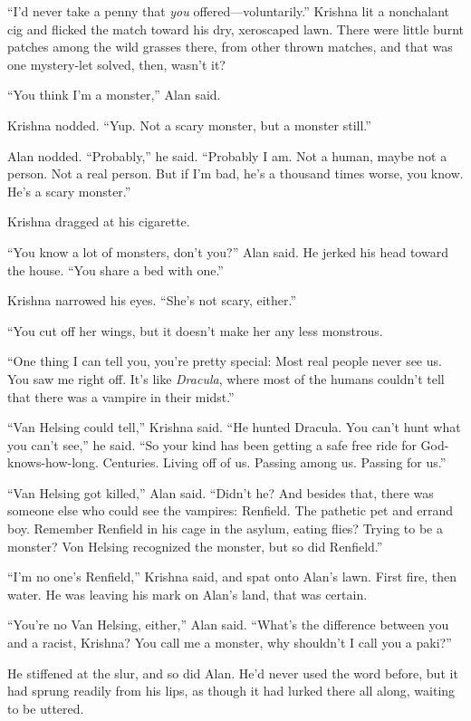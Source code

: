 \documentclass{article}
\begin{document}
``I'd never take a penny that \textit{you} offered---voluntarily.''
Krishna lit a nonchalant cig and flicked the match toward his dry,
xeroscaped lawn.  There were little burnt patches among the wild
grasses there, from other thrown matches, and that was one mystery-let
solved, then, wasn't it?

``You think I'm a monster,'' Alan said.

Krishna nodded.  ``Yup.  Not a scary monster, but a monster still.''

Alan nodded.  ``Probably,'' he said.  ``Probably I am.  Not a human,
maybe not a person.  Not a real person.  But if I'm bad, he's a
thousand times worse, you know.  He's a scary monster.''

Krishna dragged at his cigarette.

``You know a lot of monsters, don't you?'' Alan said.  He jerked his
head toward the house.  ``You share a bed with one.''

Krishna narrowed his eyes.  ``She's not scary, either.''

``You cut off her wings, but it doesn't make her any less monstrous.

``One thing I can tell you, you're pretty special:  Most real people
never see us.  You saw me right off.  It's like \textit{Dracula},
where most of the humans couldn't tell that there was a vampire in
their midst.''

``Van Helsing could tell,'' Krishna said.  ``He hunted Dracula.  You
can't hunt what you can't see,'' he said.  ``So your kind has been
getting a safe free ride for God-knows-how-long.  Centuries.  Living
off of us.  Passing among us.  Passing for us.''

``Van Helsing got killed,'' Alan said.  ``Didn't he?  And besides
that, there was someone else who could see the vampires:  Renfield. 
The pathetic pet and errand boy.  Remember Renfield in his cage in the
asylum, eating flies?  Trying to be a monster?  Von Helsing recognized
the monster, but so did Renfield.''

``I'm no one's Renfield,'' Krishna said, and spat onto Alan's lawn. 
First fire, then water.  He was leaving his mark on Alan's land, that
was certain.

``You're no Van Helsing, either,'' Alan said.  ``What's the difference
between you and a racist, Krishna?  You call me a monster, why
shouldn't I call you a paki?''

He stiffened at the slur, and so did Alan.  He'd never used the word
before, but it had sprung readily from his lips, as though it had
lurked there all along, waiting to be uttered.
\end{document}
